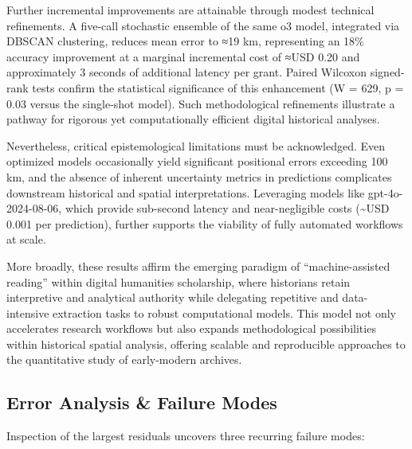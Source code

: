 Further incremental improvements are attainable through modest technical
refinements. A five-call stochastic ensemble of the same o3 model,
integrated via DBSCAN clustering, reduces mean error to ≈19 km,
representing an 18\% accuracy improvement at a marginal incremental cost
of ≈USD 0.20 and approximately 3 seconds of additional latency per
grant. Paired Wilcoxon signed-rank tests confirm the statistical
significance of this enhancement (W = 629, p = 0.03 versus the
single-shot model). Such methodological refinements illustrate a pathway
for rigorous yet computationally efficient digital historical analyses.

Nevertheless, critical epistemological limitations must be acknowledged.
Even optimized models occasionally yield significant positional errors
exceeding 100 km, and the absence of inherent uncertainty metrics in
predictions complicates downstream historical and spatial
interpretations. Leveraging models like gpt-4o-2024-08-06, which provide
sub-second latency and near-negligible costs (\textasciitilde USD 0.001
per prediction), further supports the viability of fully automated
workflows at scale.

More broadly, these results affirm the emerging paradigm of
``machine-assisted reading'' within digital humanities scholarship,
where historians retain interpretive and analytical authority while
delegating repetitive and data-intensive extraction tasks to robust
computational models. This model not only accelerates research workflows
but also expands methodological possibilities within historical spatial
analysis, offering scalable and reproducible approaches to the
quantitative study of early-modern archives.

\subsection{Error Analysis \& Failure
Modes}\label{error-analysis-failure-modes}

Inspection of the largest residuals uncovers three recurring failure
modes:


